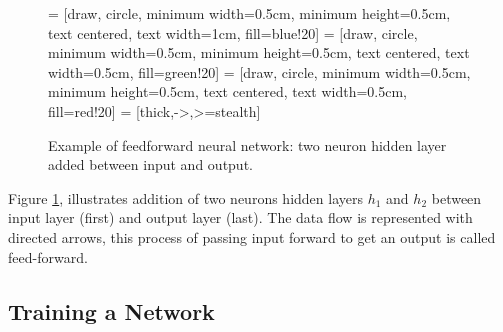\begin{figure}[H]
    \centering

 = [draw, circle, minimum width=0.5cm, minimum height=0.5cm, text centered, text width=1cm, fill=blue!20]
 = [draw, circle, minimum width=0.5cm, minimum height=0.5cm, text centered, text width=0.5cm, fill=green!20]
 = [draw, circle, minimum width=0.5cm, minimum height=0.5cm, text centered, text width=0.5cm, fill=red!20]
 = [thick,->,>=stealth]

\caption{Example of feedforward neural network: two neuron hidden layer added between input and output.}
   \label{fig:nn_hl} 
\end{figure}

Figure \ref{fig:nn_hl}, illustrates addition of two neurons hidden layers $h_1$ and $h_2$ between input layer (first) and output layer (last). The data flow is represented with directed arrows, this process of passing input forward to get an output is called feed-forward.

\subsection*{Training a Network}

